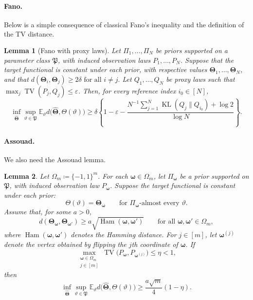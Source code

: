 \documentclass[11pt]{article}
\newtheorem{lemma}{Lemma}
\newcommand{\E}{\mathbb{E}}
\begin{document}
\paragraph{Fano.} Below is a simple consequence of classical Fano's inequality and the definition of the TV distance.
\begin{lemma}[Fano with proxy laws]
\label{lem:fano-proxy}
Let $\Pi_1,\ldots,\Pi_N$ be priors supported on a parameter class
$\mathfrak P$, with induced observation laws $P_1,\ldots,P_N$. Suppose that
the target functional is constant under each prior, with respective values
$\bm\Theta_1,\ldots,\bm\Theta_N$, and that
$d(\bm\Theta_i,\bm\Theta_j)\ge 2\delta \text{ for all }i\ne j.$
Let $Q_1,\ldots,Q_N$ be proxy laws such that
$\max_j\operatorname{TV}(P_j,Q_j)\le\varepsilon$. Then, for every reference index
$i_0\in[N]$,
\[
  \inf_{\widehat{\bm\Theta}}
  \sup_{\vartheta\in\mathfrak P}
  \E_\vartheta
  d\bigl(\widehat{\bm\Theta},\Theta(\vartheta)\bigr)
  \ge
  \delta\left\{
    1-\varepsilon
    -\frac{N^{-1}\sum_{j=1}^N
      \operatorname{KL}(Q_j\|Q_{i_0})+\log 2}{\log N}
  \right\}.
\]
\end{lemma}



\paragraph{Assouad.}
We also need the Assouad lemma. 
\begin{lemma}
\label{lem:assouad}
Let $\Omega_m\coloneqq\{-1,1\}^m$. For each
$\bm\omega\in\Omega_m$, let $\Pi_{\bm\omega}$ be a prior supported on
$\mathfrak P$, with induced observation law $P_{\bm\omega}$. Suppose
the target functional is constant under each prior:
\[
  \Theta(\vartheta)=\bm\Theta_{\bm\omega}
  \qquad
  \text{for $\Pi_{\bm\omega}$-almost every $\vartheta$}.
\]
Assume that, for some $a>0$,
\[
  d(\bm\Theta_{\bm\omega},\bm\Theta_{\bm\omega'})
  \ge
  a\sqrt{\operatorname{Ham}(\bm\omega,\bm\omega')}
  \qquad
  \text{for all }\bm\omega,\bm\omega'\in\Omega_m,
\]
where $\operatorname{Ham}(\bm\omega,\bm\omega')$
denotes the Hamming distance.
For $j\in[m]$, let $\bm\omega^{(j)}$ denote the vertex obtained by
flipping the $j$th coordinate of $\bm\omega$. If
\[
  \max_{\substack{\bm\omega\in\Omega_m\\j\in[m]}}
  \operatorname{TV}
  \bigl(P_{\bm\omega},P_{\bm\omega^{(j)}}\bigr)
  \le \eta<1,
\]
then
\[
  \inf_{\widehat{\bm\Theta}}
  \sup_{\vartheta\in\mathfrak P}
  \mathbb E_\vartheta
  d\bigl(\widehat{\bm\Theta},\Theta(\vartheta)\bigr)
  \ge
  \frac{a\sqrt m}{4}(1-\eta).
\]
\end{lemma}
\end{document}
